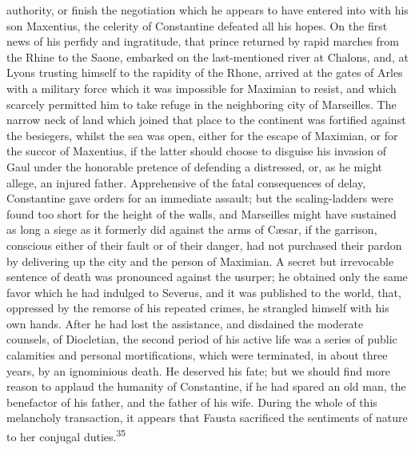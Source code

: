 authority, or finish the negotiation which he appears to have
entered into with his son Maxentius, the celerity of Constantine
defeated all his hopes. On the first news of his perfidy and
ingratitude, that prince returned by rapid marches from the Rhine
to the Saone, embarked on the last-mentioned river at Chalons,
and, at Lyons trusting himself to the rapidity of the Rhone,
arrived at the gates of Arles with a military force which it was
impossible for Maximian to resist, and which scarcely permitted
him to take refuge in the neighboring city of Marseilles. The
narrow neck of land which joined that place to the continent was
fortified against the besiegers, whilst the sea was open, either
for the escape of Maximian, or for the succor of Maxentius, if
the latter should choose to disguise his invasion of Gaul under
the honorable pretence of defending a distressed, or, as he might
allege, an injured father. Apprehensive of the fatal consequences
of delay, Constantine gave orders for an immediate assault; but
the scaling-ladders were found too short for the height of the
walls, and Marseilles might have sustained as long a siege as it
formerly did against the arms of Cæsar, if the garrison,
conscious either of their fault or of their danger, had not
purchased their pardon by delivering up the city and the person
of Maximian. A secret but irrevocable sentence of death was
pronounced against the usurper; he obtained only the same favor
which he had indulged to Severus, and it was published to the
world, that, oppressed by the remorse of his repeated crimes, he
strangled himself with his own hands. After he had lost the
assistance, and disdained the moderate counsels, of Diocletian,
the second period of his active life was a series of public
calamities and personal mortifications, which were terminated, in
about three years, by an ignominious death. He deserved his fate;
but we should find more reason to applaud the humanity of
Constantine, if he had spared an old man, the benefactor of his
father, and the father of his wife. During the whole of this
melancholy transaction, it appears that Fausta sacrificed the
sentiments of nature to her conjugal duties.\textsuperscript{35}



